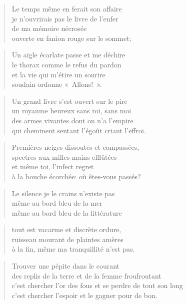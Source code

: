   \begin{verse}
    Le temps même en ferait son affaire\\
    je n’ouvrirais pas le livre de l’enfer\\
    de ma mémoire nécrosée\\
    ouverte en fanion rouge sur le sommet;
  \end{verse}
  \begin{verse}
    Un aigle écarlate passe et me déchire\\
    le thorax comme le refus du pardon\\
    et la vie qui m’étire un sourire\\
    soudain ordonne «~Allons!~».
  \end{verse}
  \begin{verse}
    Un grand livre s’est ouvert sur le pire\\
    un royaume heureux sans roi, sans moi\\
    des armes vivantes dont on n’a l’empire\\
    qui cheminent sentant l’égoût criant l’effroi.
  \end{verse}
  \begin{verse}
    Premières neiges dissoutes et compassées,\\
    spectres aux milles mains efflûtées\\
    et même toi, l’infect regret\\
    à la bouche écorchée: où êtes-vous passés?
  \end{verse}

  \begin{verse}
    Le silence je le crains n’existe pas\\
    même au bord bleu de la mer\\
    même au bord bleu de la littérature
  \end{verse}
  \begin{verse}
    tout est vacarme et discrète ordure,\\
    ruisseau mourant de plaintes amères\\
    à la fin, même ma tranquillité n’est pas.
  \end{verse}
  \begin{verse}
    Trouver une pépite dans le courant\\
    des replis de la terre et de la femme froufroutant\\
    c’est chercher l’or des fous et se perdre de tout son long\\
    c’est chercher l’espoir et le gagner pour de bon.
  \end{verse}

